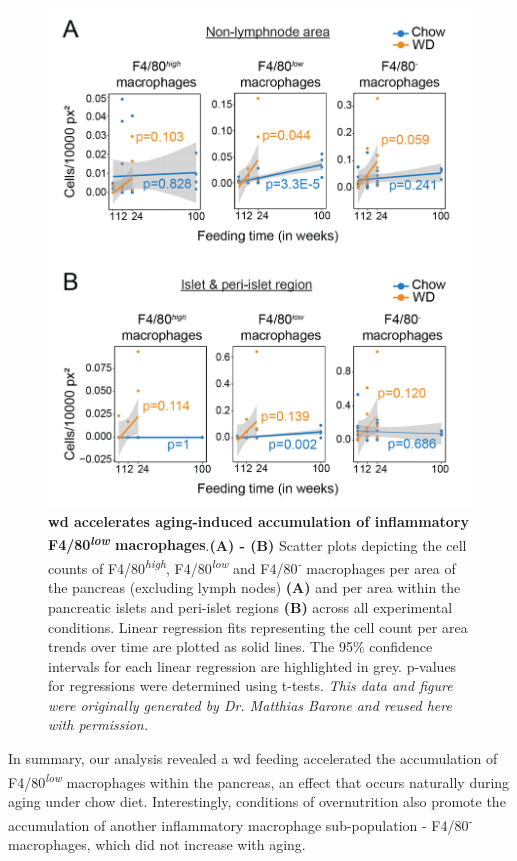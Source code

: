 \begin{figure}
  \centering
  \includegraphics[width=0.5\linewidth]{Chapter4/Fig/F2-9-02.png}
  \vspace{-10pt}
  \caption[Accumulation of inflammatory macrophages within the pancreas]{\textbf{\gls{wd} accelerates aging-induced accumulation of inflammatory F4/80\textsuperscript{\textit{low}} macrophages}.\textbf{(A) - (B)} Scatter plots depicting the cell counts of F4/80\textsuperscript{\textit{high}}, F4/80\textsuperscript{\textit{low}} and F4/80\textsuperscript{\textit{-}} macrophages per area of the pancreas (excluding lymph nodes) \textbf{(A)} and per area within the pancreatic islets and peri-islet regions \textbf{(B)}  across all experimental conditions. Linear regression fits representing the cell count per area trends over time are plotted as solid lines. The 95\% confidence intervals for each linear regression are highlighted in grey. p-values for regressions were determined using t-tests. \textit{This data and figure were originally generated by Dr. Matthias Barone and reused here with permission.}}
  \label{fig:chp2_imc_macrophages2}

\end{figure}

\vspace{20pt}

\par In summary, our analysis revealed a \gls{wd} feeding accelerated the accumulation of F4/80\textsuperscript{\textit{low}} macrophages within the pancreas, an effect that occurs naturally during aging under chow diet. Interestingly, conditions of overnutrition also promote the accumulation of another inflammatory macrophage sub-population - F4/80\textsuperscript{-} macrophages, which did not increase with aging.%

